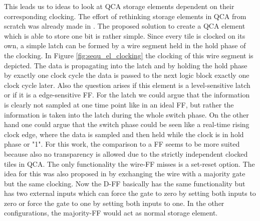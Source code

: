 This leads us to ideas to look at QCA storage elements dependent on their corresponding clocking.
The effort of rethinking storage elements in QCA from scratch was already made in \cite{torres2018synchronization}. The proposed solution to create a QCA element which is able to store one bit is rather simple. Since every tile is clocked on its own, a simple latch can be formed by a wire segment held in the hold phase of the clocking. In Figure \ref{fig:sequ_el_clocking} the clocking of this wire segment is depicted. The data is propagating into the latch and by holding the hold phase by exactly one clock cycle the data is passed to the next logic block exactly one clock cycle later. Also the question arises if this element is a level-sensitive latch or if it is a edge-sensitive FF. For the latch we could argue that the information is clearly not sampled at one time point like in an ideal FF, but rather the information is taken into the latch during the whole switch phase. On the other hand one could argue that the switch phase could be seen like a real-time rising clock edge, where the data is sampled and then held while the clock is in hold phase or "1". For this work, the comparison to a FF seems to be more suited because also no transparency is allowed due to the strictly independent clocked tiles in QCA. The only functionality the wire-FF misses is a set-reset option. The idea for this was also proposed in \cite{Walter} by exchanging the wire with a majority gate but the same clocking. Now the D-FF basically has the same functionality but has two external inputs which can force the gate to zero by setting both inputs to zero or force the gate to one by setting both inputs to one. In the other configurations, the majority-FF would act as normal storage element.\\

